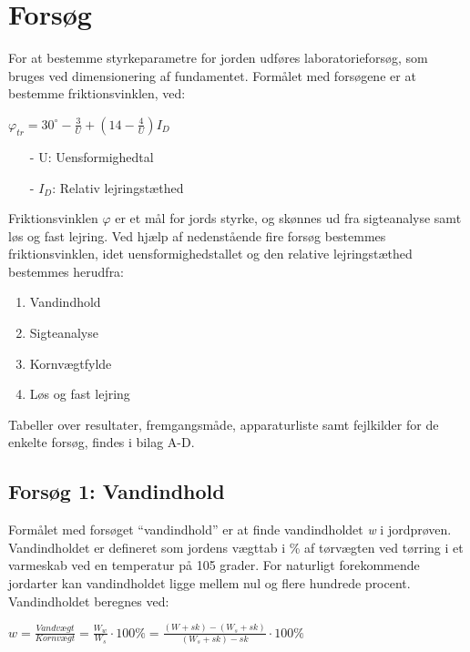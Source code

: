 \section{Forsøg}
For at bestemme styrkeparametre for jorden udføres laboratorieforsøg, som bruges ved dimensionering af fundamentet.
\newline
\newline
Formålet med forsøgene er at bestemme friktionsvinklen, ved: 

\begin{center}
	$\varphi_{tr} = 30^\circ - \frac{3}{U} + (14 - \frac{4}{U}) I_D$
\end{center}

\begin{itemize}
	\item[-] U: Uensformighedtal
	\item[-] $I_D$: Relativ lejringstæthed
\end{itemize}

Friktionsvinklen $\varphi$ er et mål for jords styrke, og skønnes ud fra sigteanalyse samt løs og fast lejring. Ved hjælp af nedenstående fire forsøg bestemmes friktionsvinklen, idet uensformighedstallet og den relative lejringstæthed bestemmes herudfra: 
\begin{enumerate}
	\item Vandindhold
	\item Sigteanalyse
	\item Kornvægtfylde
	\item Løs og fast lejring
\end{enumerate}
Tabeller over resultater, fremgangsmåde, apparaturliste samt fejlkilder for de enkelte forsøg, findes i bilag A-D.

\subsection{Forsøg 1: Vandindhold}
Formålet med forsøget “vandindhold” er at finde vandindholdet \textit{w} i jordprøven. Vandindholdet er defineret som jordens vægttab i \% af tørvægten ved tørring i et varmeskab ved en temperatur på 105 grader. For naturligt forekommende jordarter kan vandindholdet ligge mellem nul og flere hundrede procent.
\newline
\newline
Vandindholdet beregnes ved:

\begin{center}
	$w = \frac{Vandvægt}{Kornvægt} = \frac{W_w}{W_s}\cdot 100\% = \frac{(W+sk)-(W_s+sk)}{(W_s+sk)-sk}\cdot 100\%$
\end{center}

